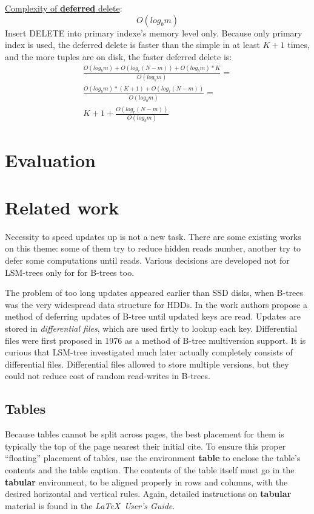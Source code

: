 \documentclass{vldb}
\begin{document}
\underline{Complexity of \textbf{deferred} delete}:
\begin{displaymath}
O(log_bm)
\end{displaymath}
Insert DELETE into primary indexe's memory level only. Because only primary
index is used, the deferred delete is faster than the simple in at least $K + 1$
times, and the more tuples are on disk, the faster deferred delete is:
\begin{gather*}
\frac{O(log_bm) + O(log_r(N-m)) + O(log_bm) * K}{O(log_bm)} = \\
\frac{O(log_bm)*(K + 1) + O(log_r(N-m))}{O(log_bm)} = \\
K + 1 + \frac{O(log_r(N-m))}{O(log_bm)}
\end{gather*}

\section{Evaluation}

\section{Related work}
Necessity to speed updates up is not a new task. There are some existing works
on this theme: some of them try to reduce hidden reads number, another try to
defer some computations until reads. Various decisions are developed not for
LSM-trees only for for B-trees too.

The problem of too long updates appeared earlier than SSD disks, when B-trees
was the very widespread data structure for HDDs. In the work
\cite{Edward:incremental_update} authors propose a method of deferring updates
of B-tree until updated keys are read. Updates are stored in
\textit{differential files}, which are used firtly to lookup each key.
Differential files were first proposed in 1976 \cite{Lohman:differential_files}
as a method of B-tree multiversion support. It is curious that LSM-tree
investigated much later actually completely consists of differential files.
Differential files allowed to store multiple versions, but they could not reduce
cost of random read-writes in B-trees.



\subsection{Tables}
Because tables cannot be split across pages, the best
placement for them is typically the top of the page
nearest their initial cite.  To
ensure this proper ``floating'' placement of tables, use the
environment \textbf{table} to enclose the table's contents and
the table caption.  The contents of the table itself must go
in the \textbf{tabular} environment, to
be aligned properly in rows and columns, with the desired
horizontal and vertical rules.  Again, detailed instructions
on \textbf{tabular} material
is found in the \textit{\LaTeX\ User's Guide}.
\end{document}
